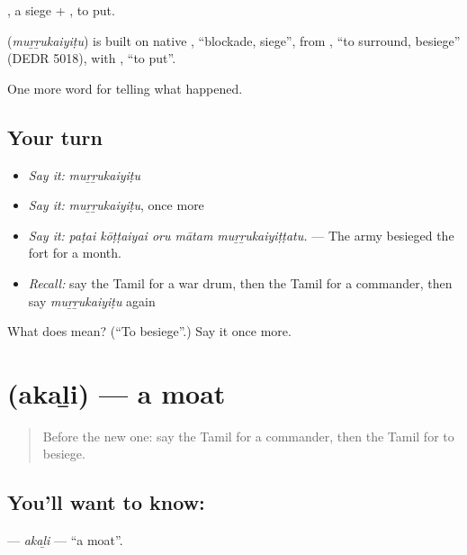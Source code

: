 , a siege + , to put.

\begin{cousinweb}
\textbf{} (\emph{muṟṟukaiyiṭu}) is built on native , \textquotedblleft{}blockade, siege\textquotedblright{}, from , \textquotedblleft{}to surround, besiege\textquotedblright{} (DEDR 5018), with , \textquotedblleft{}to put\textquotedblright{}.
\end{cousinweb}

\begin{grammarlens}[title={What you've built}]
One more word for telling what happened.
\end{grammarlens}

\subsection*{Your turn}
\begin{itemize}
\raggedright
  \item \emph{Say it:} \emph{muṟṟukaiyiṭu}
  \item \emph{Say it:} \emph{muṟṟukaiyiṭu}, once more
  \item \emph{Say it:} \emph{paṭai kōṭṭaiyai oru mātam muṟṟukaiyiṭṭatu.} — The army besieged the fort for a month.
  \item \emph{Recall:} say the Tamil for a war drum, then the Tamil for a commander, then say \emph{muṟṟukaiyiṭu} again
\end{itemize}

\begin{tcolorbox}[breakable,colback=teal!4,colframe=teal!35!black,title={Before you move on}]
What does  mean? (\textquotedblleft{}To besiege\textquotedblright{}.) Say it once more.
\end{tcolorbox}
\section[\texorpdfstring{\ta{அகழி} (akaḻi)}{அகழி (akaḻi)}]{ (akaḻi) — a moat}

\label{lesson:TA-C335-akali}



\begin{quote}
Before the new one: say the Tamil for a commander, then the Tamil for to besiege.
\end{quote}

\subsection*{You'll want to know: }
\textbf{} — \emph{akaḻi} — \textquotedblleft{}a moat\textquotedblright{}.

